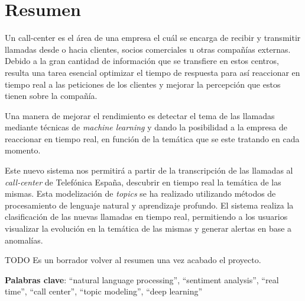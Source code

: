 




\chapter*{Resumen}


Un call-center es el área de una empresa el cuál se encarga de recibir y transmitir llamadas desde o hacia clientes, socios comerciales u otras compañías externas. Debido a la gran cantidad de información que se transfiere en estos centros, resulta una tarea esencial optimizar el tiempo de respuesta para así reaccionar en tiempo real a las peticiones de los clientes y mejorar la percepción que estos tienen sobre la compañía. 

Una manera de mejorar el rendimiento es detectar el tema de las llamadas  mediante técnicas de \textit{machine learning} y dando la posibilidad a la empresa de reaccionar en tiempo real, en función de la temática que se este tratando en cada momento. 




Este nuevo sistema nos permitirá a partir de la transcripción de las llamadas al \textit{call-center} de Telefónica España, descubrir en tiempo real la temática de las mismas. Esta modelización de \textit{topics} se ha realizado utilizando métodos de procesamiento de lenguaje natural y aprendizaje profundo. El sistema realiza la clasificación de las nuevas llamadas en tiempo real, permitiendo a los usuarios visualizar la evolución en la temática de las mismas y generar alertas en base a anomalías.  


TODO Es un borrador volver al  resumen una vez acabado el proyecto.
\onehalfspacing

\vspace{1.5cm}

\textbf{Palabras clave}: ``natural language processing'', ``sentiment analysis'', ``real time'', ``call center'', ``topic modeling'', ``deep learning''